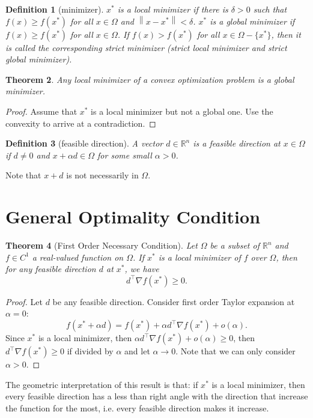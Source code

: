 \documentclass[12pt,a4paper]{report}
\numberwithin{equation}{section}
\theoremstyle{mystyle}
\newtheorem{definition}{Definition}[section]
\newtheorem{theorem}[definition]{Theorem}
\newcommand{\R}{\mathbb{R}}
\newcommand{\grad}{\nabla}
\newcommand{\T}{\top}
\newcommand{\norm}[1]{\left\lVert #1 \right\rVert}
\begin{document}
	\begin{definition}[minimizer]
		$x^*$ is a \emph{local minimizer} if there is $\delta >0$ such that $f(x)\geq f(x^*)$ for all $x\in \Omega$ and $\norm{x-x^*}<\delta$. $x^*$ is a \emph{global minimizer} if $f(x)\geq f(x^*)$ for all $x\in \Omega$. If $f(x)>f(x^*)$ for all $x\in \Omega-\{x^*\}$, then it is called the corresponding strict minimizer (strict local minimizer and strict global minimizer).
	\end{definition}

	\begin{theorem}
		Any local minimizer of a convex optimization problem is a global minimizer.
	\end{theorem}
	\begin{proof}
		Assume that $x^*$ is a local minimizer but not a global one. Use the convexity to arrive at a contradiction.
	\end{proof}
	
	
	\begin{definition}[feasible direction]
		A vector $d\in \R^n$ is a feasible direction at $x\in \Omega$ if $d\neq 0$ and $x+\alpha d\in \Omega$ for some small $\alpha>0$.
	\end{definition}
	Note that $x+d$ is not necessarily in $\Omega$.
	
	\section{General Optimality Condition}
	\begin{theorem}[First Order Necessary Condition]
		Let $\Omega$ be a subset of $\R^n$ and $f\in C^1$ a real-valued function on $\Omega$. If $x^*$ is a local minimizer of $f$ over $\Omega$, then for any feasible direction $d$ at $x^*$, we have
		$$
		d^\T \grad f(x^*)\geq 0.
		$$
	\end{theorem}
	\begin{proof}
		Let $d$ be any feasible direction. Consider first order Taylor expansion at $\alpha=0$:
		$$
		f(x^*+\alpha d)= f(x^*)+\alpha d^\T \grad f(x^*) +o(\alpha).
		$$
		Since $x^*$ is a local minimizer, then $\alpha d^\T \grad f(x^*) +o(\alpha)\geq 0$, then $d^\T \grad f(x^*)\geq 0$ if divided by $\alpha$ and let $\alpha\to 0$. Note that we can only consider $\alpha>0$.
	\end{proof}
	The geometric interpretation of this result is that: if $x^*$ is a local minimizer, then every feasible direction has a less than right angle with the direction that increase the function for the most, i.e. every feasible direction makes it increase.
	
\end{document}
